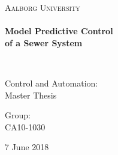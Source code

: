 %

\thispagestyle{empty}

\begin{center}

\vspace*{\fill}

\textsc{\LARGE Aalborg University}\\[1.0cm]

\HRule \\[0.4cm]
{ \HUGE \bfseries Model Predictive Control \\ of a Sewer System%
\\[0.5cm] } %

\HRule \\[1.5cm]%


\begin{minipage}{0.4\textwidth}
\begin{flushleft} \large
Control and Automation:\\
Master Thesis
\end{flushleft}
\end{minipage}
\begin{minipage}{0.4\textwidth}
\begin{flushright} \large
Group: \\
CA10-1030
\end{flushright}
\end{minipage}

\vspace*{\fill}


{\large 7 June 2018}

\end{center}
